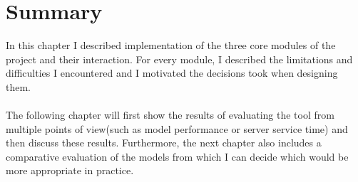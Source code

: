 	\section{Summary} \label{Section: impl/summary}
	In this chapter I described implementation of the three core modules of the project and their interaction. For every module, I described the limitations and difficulties I encountered and I motivated the decisions took when designing them. 
	\\ \\
	The following chapter will first show the results of evaluating the tool from multiple points of view(such as model performance or server service time) and then discuss these results. Furthermore, the next chapter also includes a comparative evaluation of the models from which I can decide which would be more appropriate in practice. 
